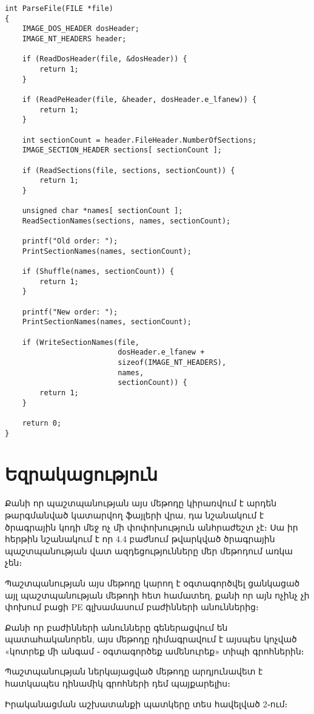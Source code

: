 \documentclass[12pt]{article}
\begin{document}
\begin{sloppypar}
\begin{lstlisting}
int ParseFile(FILE *file)
{
    IMAGE_DOS_HEADER dosHeader;
    IMAGE_NT_HEADERS header;

    if (ReadDosHeader(file, &dosHeader)) {
        return 1;
    }

    if (ReadPeHeader(file, &header, dosHeader.e_lfanew)) {
        return 1;
    }

    int sectionCount = header.FileHeader.NumberOfSections;
    IMAGE_SECTION_HEADER sections[ sectionCount ];

    if (ReadSections(file, sections, sectionCount)) {
        return 1;
    }

    unsigned char *names[ sectionCount ];
    ReadSectionNames(sections, names, sectionCount);

    printf("Old order: ");
    PrintSectionNames(names, sectionCount);

    if (Shuffle(names, sectionCount)) {
        return 1;
    }

    printf("New order: ");
    PrintSectionNames(names, sectionCount);

    if (WriteSectionNames(file,
                          dosHeader.e_lfanew +
                          sizeof(IMAGE_NT_HEADERS),
                          names,
                          sectionCount)) {
        return 1;
    }

    return 0;
}
\end{lstlisting}

\newpage
\section{Եզրակացություն}
Քանի որ պաշտպանության այս մեթոդը կիրառվում է արդեն թարգմանված կատարվող ֆայլերի
վրա, դա նշանակում է ծրագրային կոդի մեջ ոչ մի փոփոխություն անհրաժեշտ չէ։
Սա իր հերթին նշանակում է որ 4.4 բաժնում թվարկված ծրագրային պաշտպանության
վատ ազդեցությունները մեր մեթոդում առկա չեն։

Պաշտպանության այս մեթոդը կարող է օգտագործվել ցանկացած այլ պաշտպանության մեթոդի
հետ համատեղ, քանի որ այն ոչինչ չի փոխում բացի PE գլխամասում բաժինների
անուններից։

Քանի որ բաժինների անունները գեներացվում են պատահականորեն, այս մեթոդը
դիմագրավում է այսպես կոչված «կոտրեք մի անգամ ֊ օգտագործեք ամենուրեք» տիպի
գրոհներին։

Պաշտպանության ներկայացված մեթոդը արդյունավետ է հատկապես դինամիկ գրոհների
դեմ պայքարելիս։

Իրականացման աշխատանքի պատկերը տես հավելված 2֊ում։


\end{sloppypar}
\end{document}
